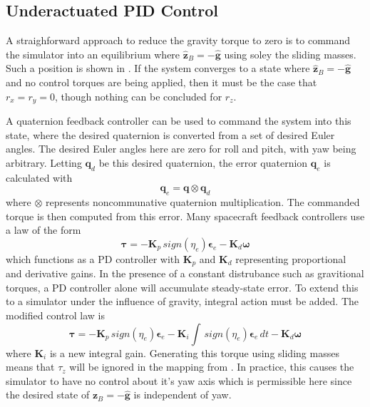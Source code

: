\subsection{Underactuated PID Control}\label{sec:under_PID}

A straighforward approach to reduce the gravity torque to zero is to command the simulator into an equilibrium where $\hat{\bm{z}}_B=-\hat{\bm{g}}$ using soley the sliding masses. Such a position is shown in . If the system converges to a state where $\hat{\bm{z}}_B=-\hat{\bm{g}}$ and no control torques are being applied, then it must be the case that $r_x=r_y=0$, though nothing can be concluded for $r_z$.

A quaternion feedback controller can be used to command the system into this state, where the desired quaternion is converted from a set of desired Euler angles. The desired Euler angles here are zero for roll and pitch, with yaw being arbitrary. Letting $\bm{q}_d$ be this desired quaternion, the error quaternion $\bm{q}_e$ is calculated with
\begin{equation}
    \bm{q}_e = \bm{q}\otimes\bm{q}_d
\end{equation}
where $\otimes$ represents noncommunative quaternion multiplication. The commanded torque is then computed from this error. Many spacecraft feedback controllers use a law of the form
\begin{equation}\label{equation:spacecraft_PD}
    \bm{\tau} = -\bm{K}_p\,sign(\eta_e)\bm{\epsilon}_e-\bm{K}_d\bm{\omega}
\end{equation}
which functions as a PD controller with $\bm{K}_p$ and $\bm{K}_d$ representing proportional and derivative gains. In the presence of a constant distrubance such as gravitional torques, a PD controller alone will accumulate steady-state error. To extend this to a simulator under the influence of gravity, integral action must be added. The modified control law is
\begin{equation}
    \bm{\tau} = -\bm{K}_p\,sign(\eta_e)\bm{\epsilon}_e
    -\bm{K}_i\int\,sign(\eta_e)\bm{\epsilon}_e\,dt
    -\bm{K}_d\bm{\omega}
\end{equation}
where $\bm{K}_i$ is a new integral gain. Generating this torque using sliding masses means that $\tau_z$ will be ignored in the mapping from . In practice, this causes the simulator to have no control about it's yaw axis which is permissible here since the desired state of ${\bm{z}}_B=-\hat{\bm{g}}$ is independent of yaw.

